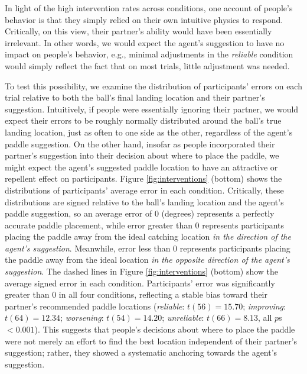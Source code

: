 \documentclass[10pt,letterpaper]{article}
\begin{document}
In light of the high intervention rates across conditions, one account of people's behavior is that they simply relied on their own intuitive physics to respond. Critically, on this view, their partner's ability would have been essentially irrelevant. In other words, we would expect the agent's suggestion to have no impact on people's behavior, e.g., minimal adjustments in the \textit{reliable} condition would simply reflect the fact that on most trials, little adjustment was needed. 

To test this possibility, we examine the distribution of participants' errors on each trial relative to both the ball's final landing location and their partner's suggestion. Intuitively, if people were essentially ignoring their partner, we would expect their errors to be roughly normally distributed around the ball's true landing location, just as often to one side as the other, regardless of the agent's paddle suggestion. On the other hand, insofar as people incorporated their partner's suggestion into their decision about where to place the paddle, we might expect the agent's suggested paddle location to have an attractive or repellent effect on participants. Figure \ref{fig:interventions} (bottom) shows the distributions of participants' average error in each condition. Critically, these distributions are signed relative to the ball's landing location and the agent's paddle suggestion, so an average error of 0 (degrees) represents a perfectly accurate paddle placement, while error greater than 0 represents participants placing the paddle away from the ideal catching location \textit{in the direction of the agent's suggestion}. Meanwhile, error less than 0 represents participants placing the paddle away from the ideal location \textit{in the opposite direction of the agent's suggestion}. The dashed lines in Figure \ref{fig:interventions} (bottom) show the average signed error in each condition. Participants' error was significantly greater than $0$ in all four conditions, reflecting a stable bias toward their partner's recommended paddle locations (\textit{reliable}: $t(56) = 15.70$; \textit{improving}: $t(64) = 12.34$; \textit{worsening}: $t(54) = 14.20$; \textit{unreliable}: $t(66) = 8.13$, all $p$s $< 0.001$). This suggests that people's decisions about where to place the paddle were not merely an effort to find the best location independent of their partner's suggestion; rather, they showed a systematic anchoring towards the agent's suggestion.
\end{document}
